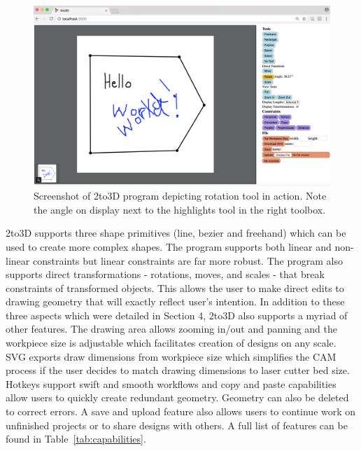 \begin{figure}[H]
  \includegraphics[width=\linewidth]{screenshot2.png}
  \caption{Screenshot of 2to3D program depicting rotation tool in action. Note the angle on display next to the highlights tool in the right toolbox.}
  \label{fig:screenshot2}
\end{figure}

2to3D supports three shape primitives (line, bezier and freehand) which can be used to create more complex shapes. The program supports both linear and non-linear constraints but linear constraints are far more robust. The program also supports direct transformations - rotations, moves, and scales - that break constraints of transformed objects. This allows the user to make direct edits to drawing geometry that will exactly reflect user's intention. In addition to these three aspects which were detailed in Section 4, 2to3D also supports a myriad of other features. The drawing area allows zooming in/out and panning and the workpiece size is adjustable which facilitates creation of designs on any scale. SVG exports draw dimensions from workpiece size which simplifies the CAM process if the user decides to match drawing dimensions to laser cutter bed size. Hotkeys support swift and smooth workflows and copy and paste capabilities allow users to quickly create redundant geometry. Geometry can also be deleted to correct errors. A save and upload feature also allows users to continue work on unfinished projects or to share designs with others. A full list of features can be found in Table~\ref{tab:capabilities}.

